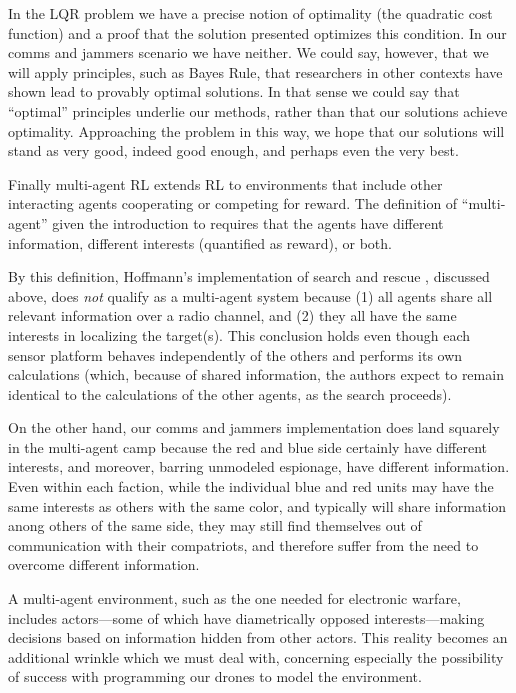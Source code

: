 \documentclass{article}
\begin{document}
In the LQR problem we have a precise notion of optimality (the
quadratic cost function) and a proof that the solution presented
optimizes this condition.  In our comms and jammers scenario we have
neither.  We could say, however, that we will apply principles, such
as Bayes Rule, that researchers in other contexts have shown lead to
provably optimal solutions.  In that sense we could say that
``optimal'' principles underlie our methods, rather than that our
solutions achieve optimality.  Approaching the problem in this way, we
hope that our solutions will stand as very good, indeed good enough,
and perhaps even the very best.

Finally multi-agent RL \cite{bucsoniu2010multi} extends RL to
environments that include other interacting agents cooperating or
competing for reward.  The definition of ``multi-agent'' given the
introduction to \cite{shoham2008multiagent} requires that the agents have
different information, different interests (quantified as reward), or
both.

By this definition, Hoffmann's implementation of search and rescue
\cite{hoffmann2009mobile}, discussed above, does \emph{not} qualify as
a multi-agent system because (1) all agents share all relevant
information over a radio channel, and (2) they all have the same
interests in localizing the target(s).  This conclusion holds even
though each sensor platform behaves independently of the others and
performs its own calculations (which, because of shared information,
the authors expect to remain identical to the calculations of the
other agents, as the search proceeds).

On the other hand, our comms and jammers implementation does land
squarely in the multi-agent camp because the red and blue side
certainly have different interests, and moreover, barring unmodeled
espionage, have different information.  Even within each faction,
while the individual blue and red units may have the same interests as
others with the same color, and typically will share information anong
others of the same side, they may still find themselves out of
communication with their compatriots, and therefore suffer from the
need to overcome different information.

A multi-agent environment, such as the one needed for electronic
warfare, includes actors---some of which have diametrically opposed
interests---making decisions based on information hidden from other
actors.  This reality becomes an additional wrinkle which we must deal
with, concerning especially the possibility of success with
programming our drones to model the environment.
\end{document}
